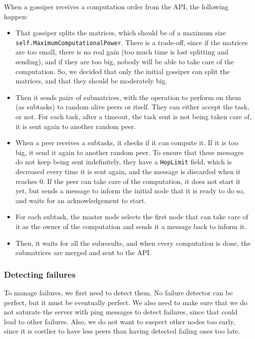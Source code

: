 \documentclass[a4paper,12pt]{article}
\begin{document}
    When a gossiper receives a computation order from the API, the following happen:
    \begin{itemize}
    \item That gossiper splits the matrices, which should be of a maximum size \texttt{self.MaximumComputationalPower}. There is a trade-off, since if the matrices are too small, there is no real gain (too much time is lost splitting and sending), and if they are too big, nobody will be able to take care of the computation. So, we decided that only the initial gossiper can split the matrices, and that they should be moderately big.
    \item Then it sends pairs of submatrices, with the operation to perform on them (as subtasks) to random alive peers or itself. They can either accept the task, or not. For each task, after a timeout, the task sent is not being taken care of, it is sent again to another random peer.
    \item When a peer receives a subtasks, it checks if it can compute it. If it is too big, it send it again to another random peer. To ensure that these messages do not keep being sent indefinitely, they have a \texttt{HopLimit} field, which is decreased every time it is sent again, and the message is discarded when it reaches 0.
    If the peer can take care of the computation, it does not start it yet, but sends a message to inform the initial node that it is ready to do so, and waits for an acknowledgement to start.
    \item For each subtask, the master node selects the first node that can take care of it as the owner of the computation and sends it a message back to inform it.
    \item Then, it waits for all the subresults, and when every computation is done, the submatrices are merged and sent to the API.
    \end{itemize}

        \subsubsection{Detecting failures}
    To manage failures, we first need to detect them. No failure detector can be perfect, but it must be eventually perfect. We also need to make sure that we do not saturate the server with ping messages to detect failures, since that could lead to other failures. Also, we do not want to suspect other nodes too early, since it is costlier to have less peers than having detected failing ones too late.
    
\end{document}
